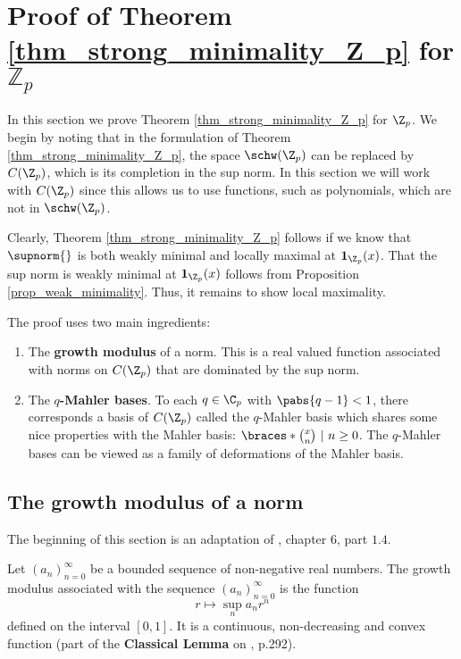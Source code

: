 \section{Proof of Theorem \ref{thm_strong_minimality_Z_p} for $\mathbb{Z}_p$}

In this section we prove Theorem \ref{thm_strong_minimality_Z_p} for $\Z_p$.
We begin by noting that in the formulation of Theorem \ref{thm_strong_minimality_Z_p}, the space $\schw(\Z_p)$ can be replaced by $C(\Z_p)$, which is its completion in the sup norm.
In this section we will work with $C(\Z_p)$ since this allows us to use functions, such as polynomials, which are not in $\schw(\Z_p)$.

Clearly, Theorem \ref{thm_strong_minimality_Z_p} follows if we know that $\supnorm{}$ is both weakly minimal and locally maximal at $\textbf{1}_{\Z_p}(x)$.
That the sup norm is weakly minimal at $\textbf{1}_{\Z_p}(x)$ follows from Proposition \ref{prop_weak_minimality}.
Thus, it remains to show local maximality.
        
The proof uses two main ingredients:
    \begin{enumerate}
    \item The \textbf{growth modulus} of a norm.
    This is a real valued function associated with norms on $C(\Z_p)$ that are dominated by the sup norm.
    \item The \textbf{$q$-Mahler bases}.
    To each $q\in \C_p$ with $\pabs{q-1}<1$, there corresponds a basis of $C(\Z_p)$ called the $q$-Mahler basis which shares some nice properties with the Mahler basis: $\braces*{\binom{x}{n}\ |\ n\geq 0}$.
    The $q$-Mahler bases can be viewed as a family of deformations of the Mahler basis.
    \end{enumerate}


\subsection{The growth modulus of a norm}
The beginning of this section is an adaptation of \cite{robert2013course}, chapter $6$, part $1.4$.

Let $(a_n)_{n=0}^\infty$ be a bounded sequence of non-negative real numbers.
The growth modulus associated with the sequence $(a_n)_{n=0}^\infty$ is the function
\[r\mapsto\sup_na_nr^n\]
defined on the interval $[0,1]$.
It is a continuous, non-decreasing and convex function (part of the \textbf{Classical Lemma} on \cite{robert2013course}, p.292).

